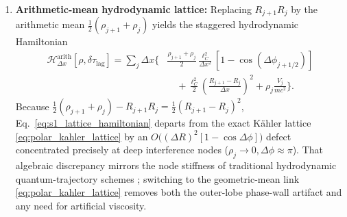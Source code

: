 \documentclass[11pt, a4paper]{article}
\theoremstyle{definition}
\begin{document}
\begin{enumerate}[label=(\alph*)]
    \begin{equation}
    \label{eq:s1_staggered_velocity}
    \begin{aligned}
    v_j &= \frac{J_{j+1/2} + J_{j-1/2}}{2\left(\rho_j + \varepsilon_{\text{reg}}^2\right)}, \\
    J_{j+1/2} &\equiv R_j R_{j+1}\frac{\ell_C c}{\Delta x}\sin(\Delta\phi_{j+1/2}) = \rho\,c^2 \frac{\partial(\delta\tau_{\text{lag}})}{\partial x} + O(\Delta x^2),
    \end{aligned}
    \end{equation}
    which is second-order accurate at interior sites (with $O(\Delta x)$ Neumann boundary truncation at replicated endpoints unless $\partial_x\delta\tau_{\text{lag}} = 0$). By the law of cosines, $R_{j+1}R_j[1 - \cos(\Delta\phi_{j+1/2})] + \frac{1}{2}(R_{j+1} - R_j)^2 = \frac{1}{2}|\Psi_{j+1} - \Psi_j|^2$. Eqs.~\eqref{eq:polar_dR_dt}--\eqref{eq:polar_dtau_dt} are therefore the exact real polar counterpart of the discrete Schr\"{o}dinger system (Theorem~\ref{thm:kahler}): for $\varepsilon_{\text{reg}} = 0$ on $R_j \neq 0$, $\mathcal{H}_{\Delta x}^{\text{polar}}$ is conserved identically, while $\varepsilon_{\text{reg}} > 0$ introduces only a localized $O\big(\varepsilon_{\text{reg}}^2 / (R_j^2 + \varepsilon_{\text{reg}}^2)\big)$ residual at nodal cores. Whenever $R_j(t)$ changes sign across a nodal curve, we canonicalize the positive-amplitude state via $\rho_j = R_j^2$ and $\delta\tau_{\text{canon}, j} = \delta\tau_j + \frac{T_0}{2}\mathbf{1}_{R_j < 0} \pmod{T_0}$.
    \item \textbf{Arithmetic-mean hydrodynamic lattice:} Replacing $R_{j+1}R_j$ by the arithmetic mean $\frac{1}{2}(\rho_{j+1} + \rho_j)$ yields the staggered hydrodynamic Hamiltonian
    \begin{equation}
    \label{eq:s1_lattice_hamiltonian}
    \begin{aligned}
    \mathcal{H}_{\Delta x}^{\text{arith}}[\rho, \delta\tau_{\text{lag}}] = \sum_j \Delta x \Bigg\{ &\frac{\rho_{j+1} + \rho_j}{2} \frac{\ell_C^2}{\Delta x^2}\left[ 1 - \cos(\Delta\phi_{j+1/2}) \right] \\
    &\quad + \frac{\ell_C^2}{2}\left( \frac{R_{j+1} - R_j}{\Delta x} \right)^2 + \rho_j \frac{V_j}{m c^2} \Bigg\}.
    \end{aligned}
    \end{equation}
    Because $\frac{1}{2}(\rho_{j+1} + \rho_j) - R_{j+1}R_j = \frac{1}{2}(R_{j+1} - R_j)^2$, Eq.~\eqref{eq:s1_lattice_hamiltonian} departs from the exact K\"{a}hler lattice \eqref{eq:polar_kahler_lattice} by an $O\big((\Delta R)^2[1 - \cos\Delta\phi]\big)$ defect concentrated precisely at deep interference nodes ($\rho_j \to 0, \Delta\phi \approx \pi$). That algebraic discrepancy mirrors the node stiffness of traditional hydrodynamic quantum-trajectory schemes \cite{Lopreore1999}; switching to the geometric-mean link \eqref{eq:polar_kahler_lattice} removes both the outer-lobe phase-wall artifact and any need for artificial viscosity.
\end{enumerate}
\end{document}
